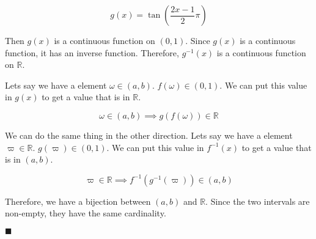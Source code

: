 \documentclass{exam}
\theoremstyle{mytheoremstyle}
\theoremstyle{mytheoremstyle}
\theoremstyle{myproblemstyle}
\begin{document}
\begin{questions}
\begin{parts}
\begin{solution}
            \[g(x)=\tan{\left(\frac{2x-1}{2}\pi\right)}\]

            Then \(\displaystyle g(x)\) is a continuous function on \((0,1)\). Since \(\displaystyle g(x)\) is a continuous function, it has an inverse function. Therefore, \(\displaystyle g^{-1}(x)\) is a continuous function on \(\mathbb{R}\).

            Lets say we have a element \(\omega\in(a,b)\). \(f(\omega)\in(0,1)\). We can put this value in \(g(x)\) to get a value that is in \(\mathbb{R}\).

            \[\omega\in(a,b)\implies g(f(\omega))\in\mathbb{R}\]

            We can do the same thing in the other direction. Lets say we have a element \(\varpi\in\mathbb{R}\). \(g(\varpi)\in(0,1)\). We can put this value in \(f^{-1}(x)\) to get a value that is in \((a,b)\).

            \[\varpi\in\mathbb{R}\implies f^{-1}(g^{-1}(\varpi))\in(a,b)\]

            Therefore, we have a bijection between \((a,b)\) and \(\mathbb{R}\). Since the two intervals are non-empty, they have the same cardinality.

            \center\(\blacksquare\)
        \end{solution}
    \end{parts}

    \newpage

    \question {}
\end{questions}
\end{document}
